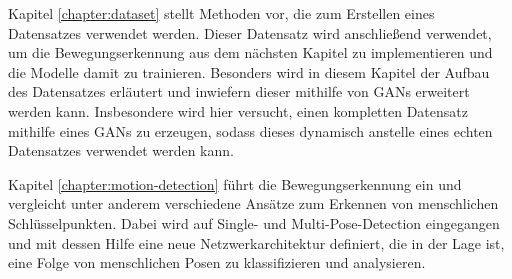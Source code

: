 Kapitel \ref{chapter:dataset} stellt Methoden vor, die zum Erstellen eines
Datensatzes verwendet werden. Dieser Datensatz wird anschließend verwendet, um
die Bewegungserkennung aus dem nächsten Kapitel zu implementieren und die
Modelle damit zu trainieren. Besonders wird in diesem Kapitel der Aufbau des
Datensatzes erläutert und inwiefern dieser mithilfe von GANs erweitert werden
kann. Insbesondere wird hier versucht, einen kompletten Datensatz mithilfe eines
GANs zu erzeugen, sodass dieses dynamisch anstelle eines echten Datensatzes
verwendet werden kann.

Kapitel \ref{chapter:motion-detection} führt die Bewegungserkennung ein und
vergleicht unter anderem verschiedene Ansätze zum Erkennen von menschlichen
Schlüsselpunkten. Dabei wird auf Single- und Multi-Pose-Detection eingegangen
und mit dessen Hilfe eine neue Netzwerkarchitektur definiert, die in der Lage
ist, eine Folge von menschlichen Posen zu klassifizieren und analysieren.